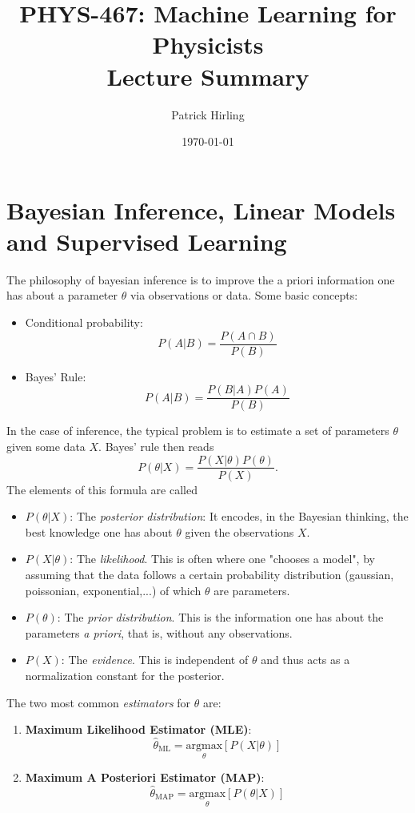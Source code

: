 \documentclass{article}
\title{PHYS-467: Machine Learning for Physicists\\\Large Lecture Summary}
\author{Patrick Hirling}
\date{\today}
\begin{document}
\maketitle
\section{Bayesian Inference, Linear Models and Supervised Learning}
The philosophy of bayesian inference is to improve the a priori information one has about a parameter $\theta$ via observations or data.
Some basic concepts:
\begin{itemize}
    \item Conditional probability:
        \begin{equation}
            P(A|B) = \frac{P(A \cap B)}{P(B)}
        \end{equation}
    \item Bayes' Rule:
        \begin{equation}
            P(A|B) = \frac{P(B|A) P(A)}{P(B)}
        \end{equation}
\end{itemize}
In the case of inference, the typical problem is to estimate a set of parameters $\theta$ given some data $X$. Bayes' rule then reads
\begin{equation}
    P(\theta|X) = \frac{P(X|\theta) P(\theta)}{P(X)}.
\end{equation}
The elements of this formula are called
\begin{itemize}
    \item $P(\theta|X)$: The \emph{posterior distribution}: It encodes, in the Bayesian thinking, the best knowledge one has about $\theta$ given the observations $X$.
    \item $P(X|\theta)$: The \emph{likelihood}. This is often where one "chooses a model", by assuming that the data follows a certain probability distribution (gaussian, poissonian, exponential,...) of which $\theta$ are parameters.
    \item $P(\theta)$: The \emph{prior distribution}. This is the information one has about the parameters \emph{a priori}, that is, without any observations.
    \item $P(X)$: The \emph{evidence}. This is independent of $\theta$ and thus acts as a normalization constant for the posterior. 
\end{itemize}
The two most common \emph{estimators} for $\theta$ are:
\begin{enumerate}
    \item \textbf{Maximum Likelihood Estimator (MLE)}:
        \begin{equation*}
            \hat{\theta}_{\text{ML}}
            =
            \underset{\theta}{\text{argmax}} \left[ P(X|\theta) \right]
        \end{equation*}
    \item \textbf{Maximum A Posteriori Estimator (MAP)}:
        \begin{equation*}
            \hat{\theta}_{\text{MAP}}
            =
            \underset{\theta}{\text{argmax}} \left[ P(\theta|X) \right]
        \end{equation*}
\end{enumerate}
\end{document}

